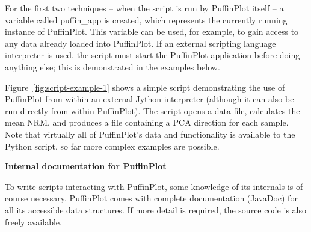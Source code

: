 \documentclass[a4paper,british]{article}
\newcommand{\ppcmd}[1]{\textsf{#1}} %
\newcommand{\caps}[1]{\MakeTextUppercase{#1}} %
\newcommand{\mypara}[1]{\noindent\textbf{#1}

\noindent\ignorespaces} %
\begin{document}
For the first two techniques -- when the script is run by PuffinPlot itself
-- a variable called \ppcmd{puffin\_app} is created, which represents the
currently running instance of PuffinPlot. This variable can be used, for
example, to gain access to any data already loaded into PuffinPlot. If an
external scripting language interpreter is used, the script must start the
PuffinPlot application before doing anything else; this is demonstrated in
the examples below.

Figure~\ref{fig:script-example-1} shows a simple script demonstrating the use
of PuffinPlot from within an external Jython interpreter (although it can
also be run directly from within PuffinPlot). The script opens a data file,
calculates the mean \caps{nrm}, and produces a file containing a \caps{pca}
direction for each sample. Note that virtually all of PuffinPlot's data and
functionality is available to the Python script, so far more complex examples
are possible.

\mypara{Internal documentation for PuffinPlot} To write scripts
interacting with PuffinPlot, some knowledge of its internals is of course
necessary. PuffinPlot comes with complete documentation (JavaDoc) for all its
accessible data structures. If more detail is required, the source code is
also freely available.
\end{document}
